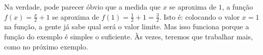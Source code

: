 Na verdade, 
pode parecer óbvio que a medida que $x$ se aproxima de $1$, a função
$f(x)=\frac{x}{2}+1$ se aproxima de $f(1)=\tfrac{1}{2}+1=\tfrac32$. Isto
é: colocando o valor $x=1$ na função, a
gente já sabe qual será o valor limite. 
Mas isso funciona porque a função do exemplo é simples o suficiente. Às 
vezes, teremos que trabalhar mais, como no próximo exemplo.




